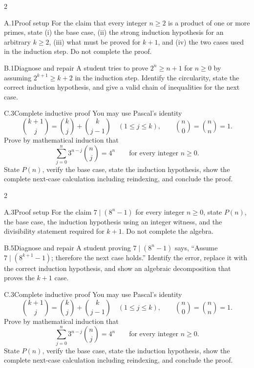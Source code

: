 \documentclass[9pt]{extarticle}
\begin{document}
\begin{multicols}{2}
\begin{CompactCoreProblem}{A.1}{Proof setup}
For the claim that every integer $n\ge2$ is a product of one or more primes, state (i) the base case, (ii) the strong induction hypothesis for an arbitrary $k\ge2$, (iii) what must be proved for $k+1$, and (iv) the two cases used in the induction step. Do not complete the proof.
\end{CompactCoreProblem}
\begin{CompactCoreProblem}{B.1}{Diagnose and repair}
A student tries to prove $2^n\ge n+1$ for $n\ge0$ by assuming $2^{k+1}\ge k+2$ in the induction step. Identify the circularity, state the correct induction hypothesis, and give a valid chain of inequalities for the next case.
\end{CompactCoreProblem}
\end{multicols}
\begin{CompactCoreProblem}{C.3}{Complete inductive proof}
You may use Pascal's identity
\[
\binom{k+1}{j}=\binom{k}{j}+\binom{k}{j-1}
\quad(1\le j\le k),\qquad
\binom{n}{0}=\binom{n}{n}=1.
\]
Prove by mathematical induction that
\[
\sum_{j=0}^{n} 3^{n-j}\binom{n}{j}=4^n\qquad\text{for every integer }n\ge0.
\]
State $P(n)$, verify the base case, state the induction hypothesis, show the complete next-case calculation including reindexing, and conclude the proof.
\end{CompactCoreProblem}
\CoreWorkArea
\FormBreak
{}
\begin{multicols}{2}
\begin{CompactCoreProblem}{A.3}{Proof setup}
For the claim $7\mid(8^n-1)$ for every integer $n\ge0$, state $P(n)$, the base case, the induction hypothesis using an integer witness, and the divisibility statement required for $k+1$. Do not complete the algebra.
\end{CompactCoreProblem}
\begin{CompactCoreProblem}{B.5}{Diagnose and repair}
A student proving $7\mid(8^n-1)$ says, “Assume $7\mid(8^{k+1}-1)$; therefore the next case holds.” Identify the error, replace it with the correct induction hypothesis, and show an algebraic decomposition that proves the $k+1$ case.
\end{CompactCoreProblem}
\end{multicols}
\begin{CompactCoreProblem}{C.3}{Complete inductive proof}
You may use Pascal's identity
\[
\binom{k+1}{j}=\binom{k}{j}+\binom{k}{j-1}
\quad(1\le j\le k),\qquad
\binom{n}{0}=\binom{n}{n}=1.
\]
Prove by mathematical induction that
\[
\sum_{j=0}^{n} 3^{n-j}\binom{n}{j}=4^n\qquad\text{for every integer }n\ge0.
\]
State $P(n)$, verify the base case, state the induction hypothesis, show the complete next-case calculation including reindexing, and conclude the proof.
\end{CompactCoreProblem}
\end{document}
